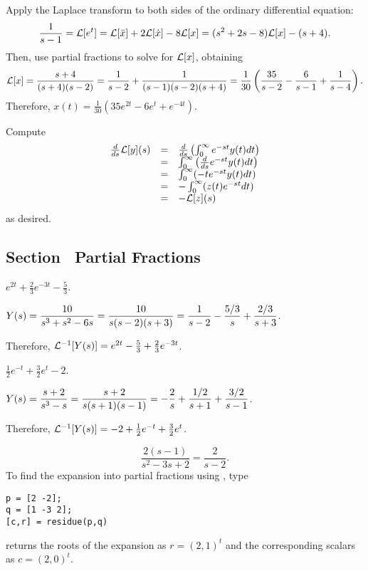 \documentclass{ximera}
\begin{document}
\soln Apply the Laplace transform to both sides of the ordinary
differential equation:
\[
\frac{1}{s-1} = {\cal L}[e^t]
= {\cal L}[\ddot{x}] + 2{\cal L}[\dot{x}] - 8{\cal L}[x]
= (s^2 + 2s - 8){\cal L}[x] - (s + 4).
\]
Then, use partial fractions to solve for ${\cal L}[x]$, obtaining
\[
{\cal L}[x] = \frac{s+4}{(s + 4)(s - 2)}
= \frac{1}{s-2} + \frac{1}{(s-1)(s-2)(s+4)}
= \frac{1}{30}\left(\frac{35}{s-2} - \frac{6}{s-1} + \frac{1}{s-4}\right).
\]
Therefore, $x(t)=\frac{1}{30}(35e^{2t}-6e^t+e^{-4t})$.


 Compute
\[
\begin{array}{rcl}
\frac{d}{ds}{\cal L}[y](s)
& = & \frac{d}{ds}\left(\int_0^\infty e^{-st}y(t)dt\right) \\
& = & \int_0^\infty\left(\frac{d}{ds} e^{-st}y(t)dt\right) \\
& = & \int_0^\infty (-te^{-st}y(t)dt) \\
& = & -\int_0^\infty (z(t)e^{-st}dt) \\
& = & -{\cal L}[z](s)
\end{array}
\]
as desired.



\newpage
\subsection*{Section~\protect{\ref{S:PF}} Partial Fractions}

 \ans $e^{2t}+\frac{2}{3}e^{-3t}-\frac{5}{3}$.

\soln $Y(s)=\displaystyle\frac{10}{s^3+s^2-6s} = \frac{10}{s(s-2)(s+3)}=
\frac{1}{s-2}-\frac{5/3}{s}+\frac{2/3}{s+3}$.  

Therefore,
${\cal L}^{-1}[Y(s)] = e^{2t}-\frac{5}{3}+\frac{2}{3}e^{-3t}$.


 \ans $\frac{1}{2}e^{-t} + \frac{3}{2}e^t -2$.

\soln $Y(s) = \displaystyle\frac{s+2}{s^3-s} = \frac{s+2}{s(s+1)(s-1)} =
-\frac{2}{s} + \frac{1/2}{s+1} + \frac{3/2}{s-1}$.

Therefore, ${\cal L}^{-1}[Y(s)] = -2 + \frac{1}{2}e^{-t} + \frac{3}{2}e^t$.


 \ans
\[
\frac{2(s - 1)}{s^2 - 3s + 2} = \frac{2}{s - 2}.
\]
\soln To find the expansion into partial fractions using \Matlabp, type
\begin{verbatim}
p = [2 -2];
q = [1 -3 2];
[c,r] = residue(p,q)
\end{verbatim}
\Matlab returns the roots of the expansion as $r = (2,1)^t$ and
the corresponding scalars as $c = (2,0)^t$.
\end{document}
